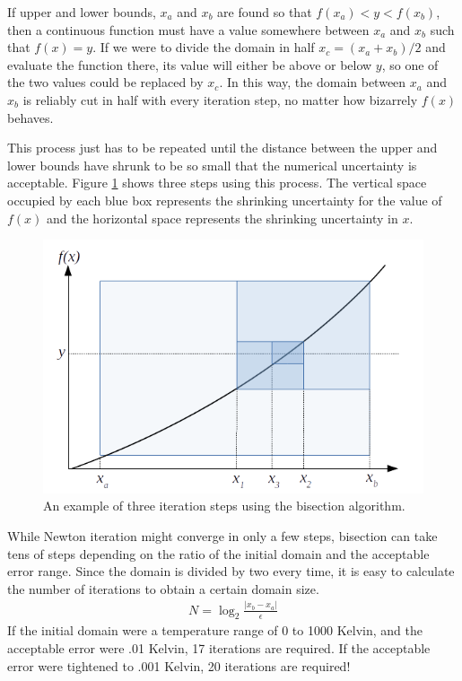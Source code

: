 \documentclass{article}
\begin{document}
If upper and lower bounds, $x_a$ and $x_b$ are found so that $f(x_a) < y < f(x_b)$, then a continuous function must have a value somewhere between $x_a$ and $x_b$ such that $f(x) = y$.  If we were to divide the domain in half $x_c = (x_a+x_b)/2$ and evaluate the function there, its value will either be above or below $y$, so one of the two values could be replaced by $x_c$.  In this way, the domain between $x_a$ and $x_b$ is reliably cut in half with every iteration step, no matter how bizarrely $f(x)$ behaves.

This process just has to be repeated until the distance between the upper and lower bounds have shrunk to be so small that the numerical uncertainty is acceptable.  Figure \ref{fig:1d:bisection} shows three steps using this process.  The vertical space occupied by each blue box represents the shrinking uncertainty for the value of $f(x)$ and the horizontal space represents the shrinking uncertainty in $x$.

\begin{figure}
\centering
\includegraphics[width = 0.8\linewidth]{figures/1d_bisection}
\caption{An example of three iteration steps using the bisection algorithm.}\label{fig:1d:bisection}
\end{figure}

While Newton iteration might converge in only a few steps, bisection can take tens of steps depending on the ratio of the initial domain and the acceptable error range.  Since the domain is divided by two every time, it is easy to calculate the number of iterations to obtain a certain domain size.
\begin{align}
N = \log_2 \frac{|x_b - x_a|}{\epsilon}
\end{align}
If the initial domain were a temperature range of 0 to 1000 Kelvin, and the acceptable error were .01 Kelvin, 17 iterations are required.  If the acceptable error were tightened to .001 Kelvin, 20 iterations are required!
\end{document}
